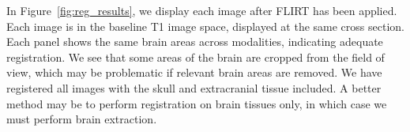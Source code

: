 In Figure~\ref{fig:reg_results}, we display each image after FLIRT has been applied.  Each image is in the baseline T1 image space, displayed at the same cross section.  Each panel shows the same brain areas across modalities, indicating adequate registration.  We see that some areas of the brain are cropped from the field of view, which may be problematic if relevant brain areas are removed.  We have registered all images with the skull and extracranial tissue included.  A better method may be to perform registration on brain tissues only, in which case we must perform brain extraction.

\begin{figure}
   \hspace*{-0.9em}
\hfill
   \hspace*{-0.9em}
\hfill
   \hspace*{-0.9em}
\hfill
\end{figure}
